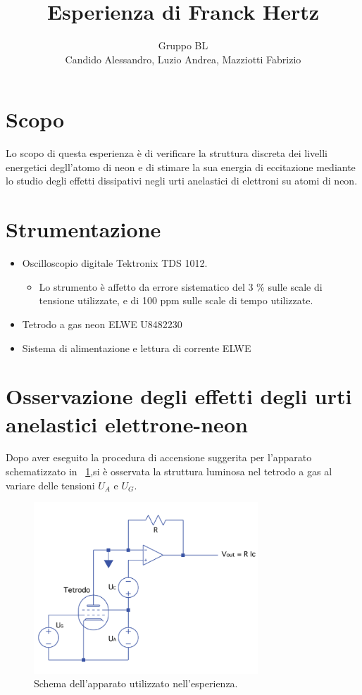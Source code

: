 \documentclass[10pt,a4paper]{article}
\title{Esperienza di Franck Hertz}
\author{Gruppo BL \\ Candido Alessandro, Luzio Andrea, Mazziotti Fabrizio}
\begin{document}
\maketitle

\section{Scopo}
Lo scopo di questa esperienza è di verificare la struttura discreta dei livelli energetici degll'atomo di neon e di stimare la sua energia di eccitazione mediante lo studio degli effetti dissipativi negli urti anelastici di elettroni su atomi di neon.

\section{Strumentazione }

\begin{itemize}
 \item Oscilloscopio digitale Tektronix TDS 1012.
 	\begin{itemize}
 		\item Lo strumento è affetto da errore sistematico del 3 \% sulle scale di tensione utilizzate, e di 100 ppm sulle scale di tempo utilizzate.
 	\end{itemize}
 \item Tetrodo a gas neon ELWE U8482230
 \item Sistema di alimentazione e lettura di corrente ELWE

\end{itemize}

\section{Osservazione degli effetti degli urti anelastici elettrone-neon}

Dopo aver eseguito la procedura di accensione suggerita per l'apparato schematizzato in \figurename{~\ref{fig:circuito}},si è osservata la struttura luminosa nel tetrodo a gas al variare delle tensioni $U_{A}$ e $U_{G}$.

\begin{figure}[h!]
	\centering
	\includegraphics[width=0.75\textwidth]{../grafici/schema_apparato.png}
	\caption{Schema dell'apparato utilizzato nell'esperienza.}
	\label{fig:circuito}
\end{figure}
\end{document}
